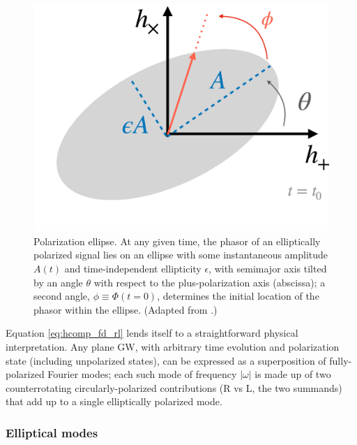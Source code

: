 \documentclass[aps,prd,twocolumn,superscriptaddress,preprintnumbers,floatfix,nofootinbib]{revtex4-2}
\begin{document}
\begin{figure}
\includegraphics[width=0.6\columnwidth]{ellipse}
\caption{Polarization ellipse. At any given time, the phasor of an elliptically polarized signal lies on an ellipse with some instantaneous amplitude $A(t)$ and time-independent ellipticity $\epsilon$, with semimajor axis tilted by an angle $\theta$ with respect to the plus-polarization axis (abscissa); a second angle, $\phi \equiv \Phi(t=0)$, determines the initial location of the phasor within the ellipse. (Adapted from \cite{Isi:2021iql}.)}
\label{fig:ellipse}
\end{figure}

Equation \eqref{eq:hcomp_fd_rl} lends itself to a straightforward physical interpretation.
Any plane GW, with arbitrary time evolution and polarization state (including unpolarized states), can be expressed as a superposition of fully-polarized Fourier modes;
each such mode of frequency $|\omega|$ is made up of two counterrotating circularly-polarized contributions (R vs L, the two summands) that add up to a single elliptically polarized mode.

\subsubsection{Elliptical modes}
\end{document}
